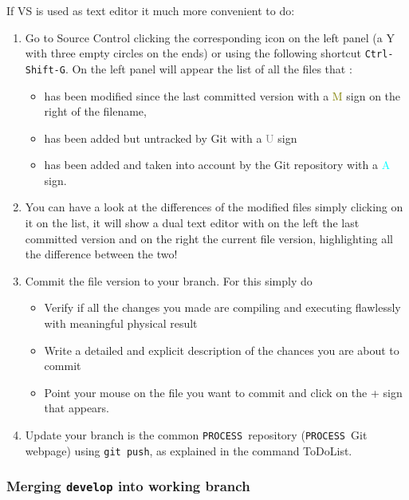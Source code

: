 \documentclass[11pt,a4paper]{report}
\newcommand{\process}{\mbox{\texttt{PROCESS}}}
\begin{document}
If VS is used as text editor it much more convenient to do:
\begin{enumerate}
	\item Go to Source Control clicking the corresponding icon on the left panel (a Y with three empty circles on the ends) or using the following shortcut \texttt{Ctrl-Shift-G}. 
	On the left panel will appear the list of all the files that :
	\begin{itemize}
		\item has been modified since the last committed version with a \textcolor{olive}{M} sign on the right of the filename,
		\item has been added but untracked by Git with a \textcolor{gray}{U} sign
		\item has been added and taken into account by the Git repository with a \textcolor{cyan}{A} sign.
	\end{itemize}
	
	\item You can have a look at the differences of the modified files simply clicking on it on the list, it will show a dual text editor with on the left the last committed version and on the right the current file version, highlighting all the difference between the two!
	
	\item Commit the file version to your branch. For this simply do
	\begin{itemize}
		\item Verify if all the changes you made are compiling and executing flawlessly with meaningful physical result
		\item Write a detailed and explicit description of the chances you are about to commit
		\item Point your mouse on the file you want to commit and click on the + sign that appears.
	\end{itemize}
	
	\item Update your branch is the common \process\ repository (\process\ Git webpage) using \texttt{git push}, as explained in the command ToDoList.
\end{enumerate}



\subsubsection{Merging \texttt{develop} into working branch}
\end{document}
